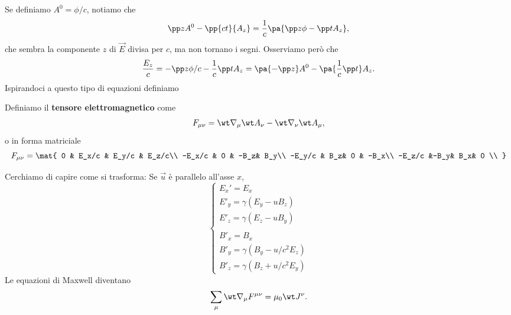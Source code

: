 \noindent
Se definiamo $A^0=\phi/c$, notiamo che
\[\pp z{A^0}-\pp{ct}{A_z}=\frac1c\pa{\pp z\phi-\pp t{A_z}},\]
che sembra la componente $z$ di $\vec E$ divisa per $c$, ma non tornano i segni. Osserviamo per\`o che
\[\frac{E_z}c=-\pp z{\phi/c}-\frac1c\pp t{A_z}=\pa{-\pp z{}}A^0-\pa{\frac1c\pp t{}}A_z.\]
Ispirandoci a questo tipo di equazioni definiamo
\begin{definition}
Definiamo il \textbf{tensore elettromagnetico} come
\[F_{\mu\nu}=\wt \nabla_\mu\wt A_\nu-\wt \nabla_\nu\wt A_{\mu},\]
o in forma matriciale
\[F_{\mu\nu}=\mat{
0 & E_x/c & E_y/c & E_z/c\\
-E_x/c & 0 & -B_z& B_y\\
-E_y/c & B_z& 0  & -B_x\\
-E_z/c &-B_y& B_x& 0  \\
}\]
\end{definition}

\noindent
Cerchiamo di capire come si trasforma: Se $\vec u$ \`e parallelo all'asse $x$,
\[\begin{cases}
E_x'=E_x\\
E'_y=\gamma(E_y-u B_z)\\
E'_z=\gamma(E_z-u B_y)\\\\
B'_x=B_x\\
B'_y=\gamma(B_y-u/c^2 E_z)\\
B'_z=\gamma(B_z+u/c^2 E_y)
\end{cases}\]
Le equazioni di Maxwell diventano
\[\sum_\mu\wt \nabla_\mu F^{\mu\nu}=\mu_0 \wt J^\nu.\]